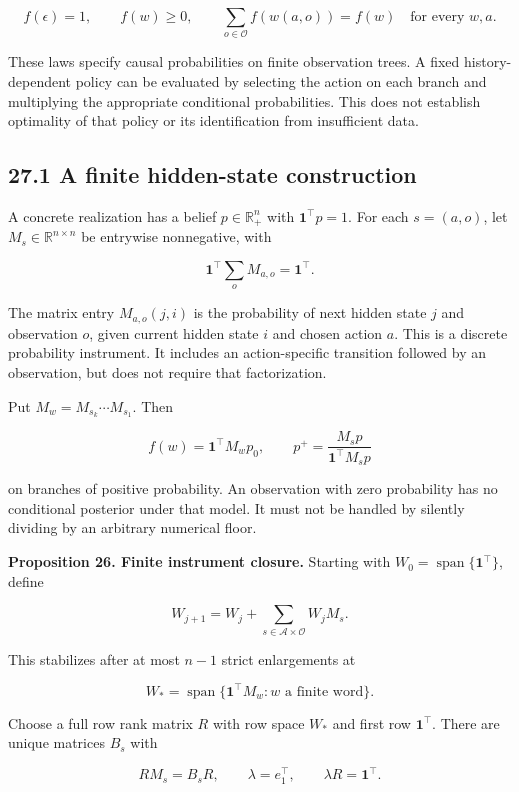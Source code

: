 \[
f(\epsilon)=1,\qquad f(w)\geq0,\qquad
\sum_{o\in\mathcal O}f(w(a,o))=f(w)
\quad\text{for every }w,a.
\]

These laws specify causal probabilities on finite observation trees. A
fixed history-dependent policy can be evaluated by selecting the action
on each branch and multiplying the appropriate conditional
probabilities. This does not establish optimality of that policy or its
identification from insufficient data.

\subsection{27.1 A finite hidden-state
construction}\label{LSM:a-finite-hidden-state-construction}

A concrete realization has a belief \(p\in\mathbb R^n_+\) with
\(\mathbf1^\top p=1\). For each \(s=(a,o)\), let
\(M_s\in\mathbb R^{n\times n}\) be entrywise nonnegative, with

\[
\mathbf1^\top\sum_oM_{a,o}=\mathbf1^\top.
\]

The matrix entry \(M_{a,o}(j,i)\) is the probability of next hidden
state \(j\) and observation \(o\), given current hidden state \(i\) and
chosen action \(a\). This is a discrete probability instrument. It
includes an action-specific transition followed by an observation, but
does not require that factorization.

Put \(M_w=M_{s_k}\cdots M_{s_1}\). Then

\[
f(w)=\mathbf1^\top M_wp_0,\qquad
p^+=\frac{M_sp}{\mathbf1^\top M_sp}
\]

on branches of positive probability. An observation with zero
probability has no conditional posterior under that model. It must not
be handled by silently dividing by an arbitrary numerical floor.

\textbf{Proposition 26. Finite instrument closure.} Starting with
\(W_0=\operatorname{span}\{\mathbf1^\top\}\), define

\[
W_{j+1}=W_j+\sum_{s\in\mathcal A\times\mathcal O}W_jM_s.
\]

This stabilizes after at most \(n-1\) strict enlargements at

\[
W_* = \operatorname{span}\{\mathbf1^\top M_w:w\text{ a finite word}\}.
\]

Choose a full row rank matrix \(R\) with row space \(W_*\) and first row
\(\mathbf1^\top\). There are unique matrices \(B_s\) with

\[
RM_s=B_sR,\qquad \lambda=e_1^\top,\qquad \lambda R=\mathbf1^\top.
\]

